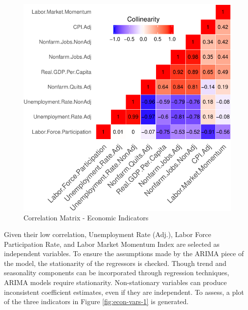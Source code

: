 \documentclass[12pt,letterpaper,toc=flat,oneside]{report}
\theoremstyle{definition}
\theoremstyle{definition}
\theoremstyle{definition}
\theoremstyle{remark}
\begin{document}
\begin{figure}[H]

{\centering \includegraphics{elliott-econometric-personnel-retention-18_files/figure-latex/heat-map-1-1} 

}

\caption{Correlation Matrix - Economic Indicators}\label{fig:heat-map-1}
\end{figure}

Given their low correlation, Unemployment Rate (Adj.), Labor Force
Participation Rate, and Labor Market Momentum Index are selected as
independent variables. To ensure the assumptions made by the ARIMA piece
of the model, the stationarity of the regressors is checked. Though
trend and seasonality components can be incorporated through regression
techniques, ARIMA models require stationarity. Non-stationary variables
can produce inconsistent coefficient estimates, even if they are
independent. To assess, a plot of the three indicators in Figure
\ref{fig:econ-vars-1} is generated.
\end{document}
